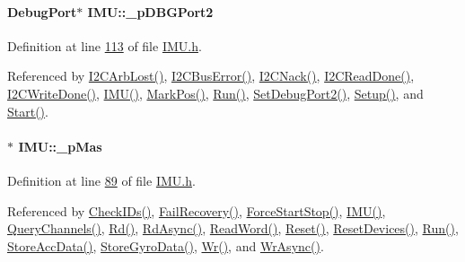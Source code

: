 \hypertarget{class_i_m_u_a1cf5672a28049d5885a2958010188928}{
\paragraph[{\_\-pDBGPort2}]{\setlength{\rightskip}{0pt plus 5cm}DebugPort$\ast$ {\bf IMU::\_\-pDBGPort2}}\hfill}
\label{class_i_m_u_a1cf5672a28049d5885a2958010188928}


Definition at line \hyperlink{_i_m_u_8h_source_l00113}{113} of file \hyperlink{_i_m_u_8h_source}{IMU.h}.



Referenced by \hyperlink{_i_m_u_8cpp_source_l00534}{I2CArbLost()}, \hyperlink{_i_m_u_8cpp_source_l00499}{I2CBusError()}, \hyperlink{_i_m_u_8cpp_source_l00463}{I2CNack()}, \hyperlink{_i_m_u_8cpp_source_l00446}{I2CReadDone()}, \hyperlink{_i_m_u_8cpp_source_l00432}{I2CWriteDone()}, \hyperlink{_i_m_u_8cpp_source_l00020}{IMU()}, \hyperlink{_i_m_u_8h_source_l00185}{MarkPos()}, \hyperlink{_i_m_u_8cpp_source_l00290}{Run()}, \hyperlink{_i_m_u_8cpp_source_l00148}{SetDebugPort2()}, \hyperlink{_i_m_u_8cpp_source_l00194}{Setup()}, and \hyperlink{_i_m_u_8cpp_source_l00239}{Start()}.

\hypertarget{class_i_m_u_a466148932203b7250c83a4c5bb684ca1}{
\paragraph[{\_\-pMas}]{$\ast$ {\bf IMU::\_\-pMas}}\hfill}
\label{class_i_m_u_a466148932203b7250c83a4c5bb684ca1}


Definition at line \hyperlink{_i_m_u_8h_source_l00089}{89} of file \hyperlink{_i_m_u_8h_source}{IMU.h}.



Referenced by \hyperlink{_i_m_u_8cpp_source_l00651}{CheckIDs()}, \hyperlink{_i_m_u_8cpp_source_l00398}{FailRecovery()}, \hyperlink{_i_m_u_8cpp_source_l00165}{ForceStartStop()}, \hyperlink{_i_m_u_8cpp_source_l00020}{IMU()}, \hyperlink{_i_m_u_8cpp_source_l00120}{QueryChannels()}, \hyperlink{_i_m_u_8cpp_source_l00766}{Rd()}, \hyperlink{_i_m_u_8cpp_source_l00786}{RdAsync()}, \hyperlink{_i_m_u_8cpp_source_l00792}{ReadWord()}, \hyperlink{_i_m_u_8cpp_source_l00153}{Reset()}, \hyperlink{_i_m_u_8cpp_source_l00160}{ResetDevices()}, \hyperlink{_i_m_u_8cpp_source_l00290}{Run()}, \hyperlink{_i_m_u_8cpp_source_l00588}{StoreAccData()}, \hyperlink{_i_m_u_8cpp_source_l00581}{StoreGyroData()}, \hyperlink{_i_m_u_8cpp_source_l00758}{Wr()}, and \hyperlink{_i_m_u_8cpp_source_l00776}{WrAsync()}.

